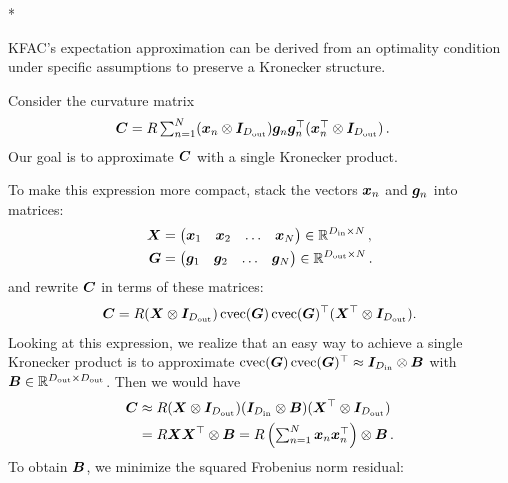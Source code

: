 \switchcolumn[1]*
\begin{example}
  \label{ex:just_kfac_exp_approx}
  KFAC's expectation approximation can be derived from an optimality condition under specific assumptions to preserve a Kronecker structure.

  Consider the curvature matrix
  \begin{align*}
    {\bm{C}}
    &=
      \textstyle
      R \sum_{n=1}^N
      ({\bm{x}}_n \otimes {\bm{I}}_{D_{\text{out}}})
      {\bm{g}}_n {\bm{g}}_n^{\top}
      ({\bm{x}}_n^{\top} \otimes {\bm{I}}_{D_{\text{out}}})\,.
  \end{align*}
  Our goal is to approximate ${\bm{C}}$ with a single Kronecker product.

  To make this expression more compact, stack the vectors ${\bm{x}}_n$ and ${\bm{g}}_n$ into matrices:
  \begin{align*}
    {\bm{X}}
    &=
      \begin{pmatrix}
        {\bm{x}}_1 & {\bm{x}}_2 & \ldots & {\bm{x}}_N
      \end{pmatrix}
      \in {\mathbb{R}}^{D_{\text{in}} \times N}\,,
    \\
    {\bm{G}}
    &=
      \begin{pmatrix}
        {\bm{g}}_1 & {\bm{g}}_2 & \ldots & {\bm{g}}_N
      \end{pmatrix}
      \in {\mathbb{R}}^{D_{\text{out}} \times N}\,.
  \end{align*}
  and rewrite ${\bm{C}}$ in terms of these matrices:
  \begin{align*}
    {\bm{C}} = R ({\bm{X}} \otimes {\bm{I}}_{D_{\text{out}}}) \operatorname{cvec}({\bm{G}}) \operatorname{cvec}({\bm{G}})^{\top}({\bm{X}}^{\top} \otimes {\bm{I}}_{D_{\text{out}}}).
  \end{align*}
  Looking at this expression, we realize that an easy way to achieve a single Kronecker product is to approximate $\operatorname{cvec}({\bm{G}}) \operatorname{cvec}({\bm{G}})^{\top} \approx {\bm{I}}_{D_{\text{in}}} \otimes {\bm{B}}$ with ${\bm{B}} \in {\mathbb{R}}^{D_{\text{out}}\times D_{\text{out}}}$.
  Then we would have
  \begin{align*}
    {\bm{C}}
    &\approx
      R ({\bm{X}} \otimes {\bm{I}}_{D_{\text{out}}})
      ({\bm{I}}_{D_{\text{in}}} \otimes {\bm{B}})
      ({\bm{X}}^{\top} \otimes {\bm{I}}_{D_{\text{out}}})
    \\
    &=
      R {\bm{X}} {\bm{X}}^{\top} \otimes {\bm{B}}
      =
      \textstyle
      R \left(\sum_{n=1}^N {\bm{x}}_n {\bm{x}}_n^{\top}\right) \otimes {\bm{B}}\,.
  \end{align*}
  To obtain ${\bm{B}}$, we minimize the squared Frobenius norm residual:
  \begin{align*}
    \begin{split}

\end{split}
\end{align*}
\end{example}
